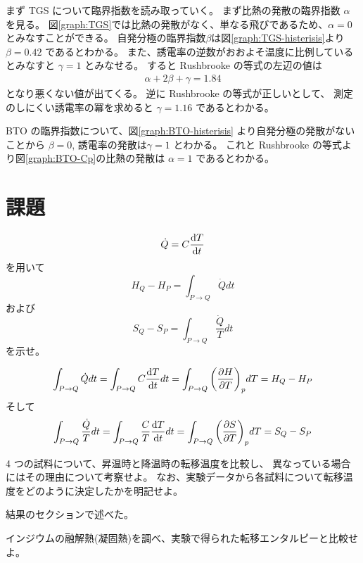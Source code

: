 \documentclass[9pt,dvipdfmx,a4paper]{jsarticle}
\begin{document}
まず TGS について臨界指数を読み取っていく。
まず比熱の発散の臨界指数 \(\alpha\) を見る。
図\ref{graph:TGS}では比熱の発散がなく、単なる飛びであるため、\(\alpha = 0\)とみなすことができる。
自発分極の臨界指数\(\beta\)は図\ref{graph:TGS-histerisis}より
\(\beta = 0.42\) であるとわかる。
また、誘電率の逆数がおおよそ温度に比例しているとみなすと \(\gamma=1\) とみなせる。
すると Rushbrooke の等式の左辺の値は
\begin{align}
    \alpha +2\beta+\gamma = 1.84
\end{align}
となり悪くない値が出てくる。
逆に Rushbrooke の等式が正しいとして、
測定のしにくい誘電率の冪を求めると \(\gamma = 1.16\) であるとわかる。

BTO の臨界指数について、図\ref{graph:BTO-histerisis} より自発分極の発散がないことから
\(\beta = 0\), 誘電率の発散は\(\gamma = 1\) とわかる。
これと Rushbrooke の等式より図\ref{graph:BTO-Cp}の比熱の発散は \(\alpha = 1\) であるとわかる。

\section{課題}
\begin{tcolorbox}[title = 課題1]
    \[\dot{Q}=C\dv{T}{t}\]を用いて
    \[H_Q-H_P = \int_{P\to Q}\dot{Q}dt\]
    および
    \[S_Q-S_P = \int_{P\to Q}\frac{\dot{Q}}{T}dt\]
    を示せ。
\end{tcolorbox}

\begin{align*}
    \int_{P\to Q}\dot{Q}dt
    = \int_{P\to Q} C\dv{T}{t}dt
    = \int_{P\to Q} \qty(\pdv{H}{T})_p dT
    = H_Q-H_P
\end{align*}
そして
\begin{align}
    \int_{P\to Q}\frac{\dot{Q}}{T}dt
    = \int_{P\to Q} \frac{C}{T}\dv{T}{t}dt
    = \int_{P\to Q} \qty(\pdv{S}{T})_p dT
    = S_Q-S_P
\end{align}

\begin{tcolorbox}[title = 課題2]
    4 つの試料について、昇温時と降温時の転移温度を比較し、
    異なっている場合にはその理由について考察せよ。
    なお、実験データから各試料について転移温度をどのように決定したかを明記せよ。
\end{tcolorbox}

結果のセクションで述べた。


\begin{tcolorbox}[title = 課題3]
    インジウムの融解熱(凝固熱)を調べ、実験で得られた転移エンタルピーと比較せよ。
\end{tcolorbox}
\end{document}
